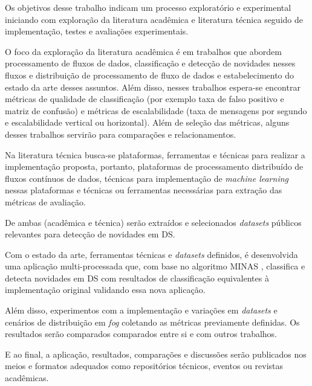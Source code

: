 
Os objetivos desse trabalho indicam um processo exploratório e experimental
iniciando com exploração da literatura acadêmica e literatura técnica seguido de
implementação, testes e avaliações experimentais.

O foco da exploração da literatura acadêmica é em trabalhos que abordem
processamento de fluxos de dados, classificação e detecção de novidades nesses
fluxos e distribuição de processamento de fluxo de dados e estabelecimento do
estado da arte desses assuntos. Além disso, nesses trabalhos espera-se encontrar
métricas de qualidade de classificação (por exemplo taxa de falso positivo e
matriz de confusão) e métricas de escalabilidade (taxa de mensagens por segundo
e escalabilidade vertical ou horizontal). Além de seleção das métricas, alguns
desses trabalhos servirão para comparações e relacionamentos.

Na literatura técnica busca-se plataformas, ferramentas e técnicas para realizar
a implementação proposta, portanto, plataformas de processamento
distribuído de fluxos contínuos de dados, técnicas para implementação de
\emph{machine learning} nessas plataformas e técnicas ou ferramentas necessárias
para extração das métricas de avaliação.

De ambas (acadêmica e técnica) serão extraídos e selecionados \emph{datasets}
públicos relevantes para detecção de novidades em DS.

Com o estado da arte, ferramentas técnicas e \emph{datasets} definidos, é
desenvolvida uma aplicação multi-processada que, com base no algoritmo MINAS
\cite{Faria2016minas}, classifica e detecta novidades em DS com resultados de
classificação equivalentes à implementação original validando essa nova
aplicação.

Além disso, experimentos com a implementação e variações em \emph{datasets} e
cenários de distribuição em \emph{fog} coletando as métricas previamente
definidas. Os resultados serão comparados comparados entre si e com outros
trabalhos.

E ao final, a aplicação, resultados, comparações e discussões serão publicados
nos meios e formatos adequados como repositórios técnicos, eventos ou revistas
acadêmicas.





